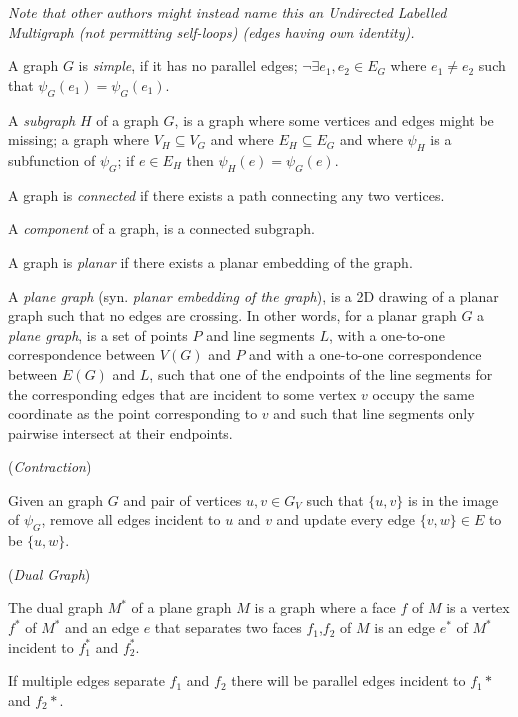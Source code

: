 \documentclass{article}
\begin{document}
	\textit{Note that other authors might instead name this an Undirected Labelled Multigraph (not permitting self-loops) (edges having own identity).}

	A graph $G$ is \textit{simple}, if it has no parallel edges; $\neg \exists e_1,e_2 \in E_G$ where $e_1 \neq e_2$ such that $\psi_G(e_1) = \psi_G(e_1)$.

	A \textit{subgraph} $H$ of a graph $G$, is a graph where some vertices and edges might be missing; a graph where $V_H \subseteq V_G$ and where $E_H \subseteq E_G$ and where $\psi_H$ is a subfunction of $\psi_G$; if $e \in E_H$ then $\psi_H(e) = \psi_G(e)$.

	A graph is \textit{connected} if there exists a path connecting any two vertices.

	A \textit{component} of a graph, is a connected subgraph.

	A graph is \textit{planar} if there exists a planar embedding of the graph.
	
	A \textit{plane graph} (syn. \textit{planar embedding of the graph}), is a 2D drawing of a planar graph such that no edges are crossing. In other words, for a planar graph $G$ a \textit{plane graph}, is a set of points $P$ and line segments $L$, with a one-to-one correspondence between $V(G)$ and $P$ and with a one-to-one correspondence between $E(G)$ and $L$, such that one of the endpoints of the line segments for the corresponding edges that are incident to some vertex $v$ occupy the same coordinate as the point corresponding to $v$ and such that line segments only pairwise intersect at their endpoints.

	\begin{definition}
		(\textit{Contraction})

		Given an graph $G$ and pair of vertices $u,v \in G_V$ such that $\{u,v\}$ is in the image of $\psi_G$, remove all edges incident to $u$ and $v$ and update every edge $\{v,w\} \in E$ to be $\{u,w\}$.
	\end{definition}

	\begin{definition}
		(\textit{Dual Graph})

		The dual graph $M^*$ of a plane graph $M$ is a graph where a face $f$ of $M$ is a vertex $f^*$ of $M^*$ and an edge $e$ that separates two faces $f_1$,$f_2$ of $M$ is an edge $e^*$ of $M^*$ incident to $f_1^*$ and $f_2^*$.
	\end{definition}
	
	\begin{corollary}
		If multiple edges separate $f_1$ and $f_2$ there will be parallel edges incident to $f_1*$ and $f_2*$.
	\end{corollary}
\end{document}
